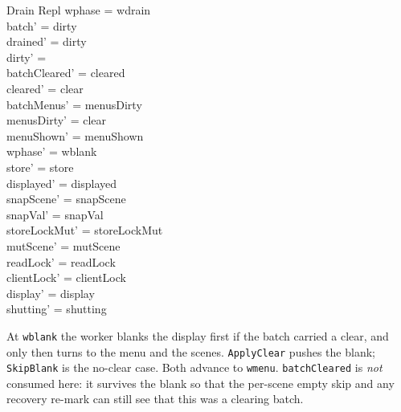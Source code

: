 \documentclass[a4paper,10pt,fleqn]{article}
\begin{document}
\begin{schema}{Drain}
  \Delta Repl
\where
  wphase = wdrain \\
  batch' = dirty \\
  drained' = dirty \\
  dirty' = \emptyset \\
  batchCleared' = cleared \\
  cleared' = clear \\
  batchMenus' = menusDirty \\
  menusDirty' = clear \\
  menuShown' = menuShown \\
  wphase' = wblank \\
  store' = store \\
  displayed' = displayed \\
  snapScene' = snapScene \\
  snapVal' = snapVal \\
  storeLockMut' = storeLockMut \\
  mutScene' = mutScene \\
  readLock' = readLock \\
  clientLock' = clientLock \\
  display' = display \\
  shutting' = shutting
\end{schema}

At \texttt{wblank} the worker blanks the display first if the batch carried
a clear, and only then turns to the menu and the scenes.  \texttt{ApplyClear}
pushes the blank; \texttt{SkipBlank} is the no-clear case.  Both advance to
\texttt{wmenu}.  \texttt{batchCleared} is \emph{not} consumed here: it survives
the blank so that the per-scene empty skip and any recovery re-mark can still
see that this was a clearing batch.
\end{document}
